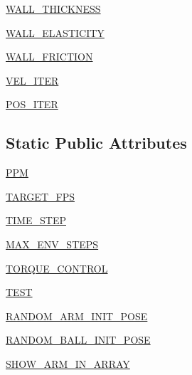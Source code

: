 \begin{DoxyCompactItemize}
\hyperlink{classtaxons_1_1gym__billiard_1_1utils_1_1parameters_1_1_params_af3284773b9e0ad46c41a6b4c2ca7fa1d}{W\+A\+L\+L\+\_\+\+T\+H\+I\+C\+K\+N\+E\+SS}
\item 
\hyperlink{classtaxons_1_1gym__billiard_1_1utils_1_1parameters_1_1_params_a0755ffba80e64cbb53b7b164f84a8901}{W\+A\+L\+L\+\_\+\+E\+L\+A\+S\+T\+I\+C\+I\+TY}
\item 
\hyperlink{classtaxons_1_1gym__billiard_1_1utils_1_1parameters_1_1_params_af98f7f440102ee0673ce03ded2750636}{W\+A\+L\+L\+\_\+\+F\+R\+I\+C\+T\+I\+ON}
\item 
\hyperlink{classtaxons_1_1gym__billiard_1_1utils_1_1parameters_1_1_params_a01eee1678c2504bbba8731b877ea613a}{V\+E\+L\+\_\+\+I\+T\+ER}
\item 
\hyperlink{classtaxons_1_1gym__billiard_1_1utils_1_1parameters_1_1_params_ad0f1b7b5b2425fa94575128d172e2a44}{P\+O\+S\+\_\+\+I\+T\+ER}
\end{DoxyCompactItemize}
\subsection*{Static Public Attributes}
\begin{DoxyCompactItemize}
\item 
\hyperlink{classtaxons_1_1gym__billiard_1_1utils_1_1parameters_1_1_params_adc737d3af5c9ee097992b3ea414d7a36}{P\+PM}
\item 
\hyperlink{classtaxons_1_1gym__billiard_1_1utils_1_1parameters_1_1_params_aa4e9027a87193b4123161ec660e131fb}{T\+A\+R\+G\+E\+T\+\_\+\+F\+PS}
\item 
\hyperlink{classtaxons_1_1gym__billiard_1_1utils_1_1parameters_1_1_params_a00e4166ef9d9be84d3972916399d59a4}{T\+I\+M\+E\+\_\+\+S\+T\+EP}
\item 
\hyperlink{classtaxons_1_1gym__billiard_1_1utils_1_1parameters_1_1_params_a5a5cfc381d70b283f82cfabf7383feda}{M\+A\+X\+\_\+\+E\+N\+V\+\_\+\+S\+T\+E\+PS}
\item 
\hyperlink{classtaxons_1_1gym__billiard_1_1utils_1_1parameters_1_1_params_a31f6eb41066660d8293c1c6bb7049c94}{T\+O\+R\+Q\+U\+E\+\_\+\+C\+O\+N\+T\+R\+OL}
\item 
\hyperlink{classtaxons_1_1gym__billiard_1_1utils_1_1parameters_1_1_params_abbb5e3b732dcf0850ec422244b3c33c4}{T\+E\+ST}
\item 
\hyperlink{classtaxons_1_1gym__billiard_1_1utils_1_1parameters_1_1_params_a0f51ef709896ca3fe0ad80f105b3a801}{R\+A\+N\+D\+O\+M\+\_\+\+A\+R\+M\+\_\+\+I\+N\+I\+T\+\_\+\+P\+O\+SE}
\item 
\hyperlink{classtaxons_1_1gym__billiard_1_1utils_1_1parameters_1_1_params_a3dfd409241807338756b556b6f80fbd0}{R\+A\+N\+D\+O\+M\+\_\+\+B\+A\+L\+L\+\_\+\+I\+N\+I\+T\+\_\+\+P\+O\+SE}
\item 
\hyperlink{classtaxons_1_1gym__billiard_1_1utils_1_1parameters_1_1_params_a0931a6c49bffad317f806036e7fa6d94}{S\+H\+O\+W\+\_\+\+A\+R\+M\+\_\+\+I\+N\+\_\+\+A\+R\+R\+AY}
\end{DoxyCompactItemize}


